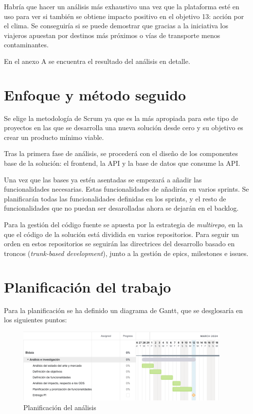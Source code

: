 Habría que hacer un análisis más exhaustivo una vez que la plataforma esté en uso para ver si también se obtiene impacto positivo en el objetivo 13: acción por el clima. Se conseguiría si se puede demostrar que gracias a la iniciativa los viajeros apuestan por destinos más próximos o vías de transporte menos contaminantes.

En el anexo A se encuentra el resultado del análisis en detalle. 

\section{Enfoque y método seguido}
Se elige la metodología de Scrum ya que es la más apropiada para este tipo de proyectos en las que se desarrolla una nueva solución desde cero y su objetivo es crear un producto mínimo viable. 

Tras la primera fase de análisis, se procederá con el diseño de los componentes base de la solución: el frontend, la API y la base de datos que consume la API. 

Una vez que las bases ya estén asentadas se empezará a añadir las funcionalidades necesarias. Estas funcionalidades de añadirán en varios sprints. Se planificarán todas las funcionalidades definidas en los sprints, y el resto de funcionalidades que no puedan ser desarolladas ahora se dejarán en el backlog. 

Para la gestión del código fuente se apuesta por la estrategia de \textit{multirepo}, en la que el código de la solución está dividida en varios repositorios. Para seguir un orden en estos repositorios se seguirán las directrices del desarrollo basado en troncos (\textit{trunk-based development}), junto a la gestión de epics, milestones e issues.

\section{Planificación del trabajo}
Para la planificación se ha definido un diagrama de Gantt, que se desglosaría en los siguientes puntos:

\begin{figure}[H]
\centering
\includegraphics[width=0.95\textwidth]{Figures/Gantt/gantt-1.png}
\caption{Planificación del análisis}
\label{gantt-1}
\end{figure}

